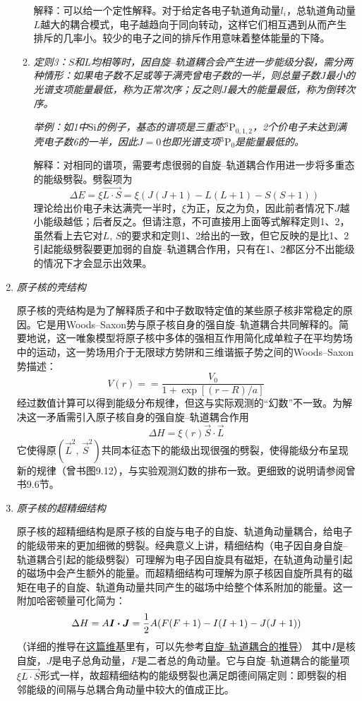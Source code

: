 \begin{enumerate}[label=\textbf{6.\Roman*}, listparindent=\parindent]
\begin{enumerate}
    解释：可以给一个定性解释。对于给定各电子轨道角动量$l_i$，总轨道角动量$L$越大的耦合模式，电子越趋向于同向转动，这样它们相互遇到从而产生排斥的几率小。较少的电子之间的排斥作用意味着整体能量的下降。
    
    \item \emph{定则3：$S$和$L$均相等时，因自旋--轨道耦合会产生进一步能级分裂，需分两种情形：如果电子数不足或等于满壳曾电子数的一半，则总量子数$J$最小的光谱支项能量最低，称为正常次序；反之则$J$最大的能量最低，称为倒转次序。}
    
    \emph{举例：如1中$\mathrm{Si}$的例子，基态的谱项是三重态$\mathrm{^3P_{0,1,2}}$，2个价电子未达到满壳电子数6的一半，因此$J=0$也即光谱支项$\mathrm{^3P_{0}}$是能量最低的。}
    
    解释：对相同的谱项，需要考虑很弱的自旋--轨道耦合作用进一步将多重态的能级劈裂。劈裂项为
    \[\Delta E = \xi \vec{L\cdot S} = \xi(J(J+1)-L(L+1)-S(S+1))\]
    理论给出价电子未达满壳一半时，$\xi$为正，反之为负，因此前者情况下$J$越小能级越低；后者反之。但请注意，不可直接用上面等式解释定则1、2，虽然看上去它对$L$, $S$的要求和定则1、2给出的一致，但它反映的是比1、2引起能级劈裂要更加弱的自旋--轨道耦合作用，只有在1、2都区分不出能级的情况下才会显示出效果。
    
\end{enumerate}

\item \emph{原子核的壳结构}

原子核的壳结构是为了解释质子和中子数取特定值的某些原子核非常稳定的原因。它是用Woods--Saxon势与原子核自身的强自旋--轨道耦合共同解释的。简要地说，这一唯象模型将原子核中多体的强相互作用简化成单粒子在平均势场中的运动，这一势场用介于无限球方势阱和三维谐振子势之间的Woods--Saxon势描述：
\[V(r)==\frac{V_0}{1+\exp[(r-R)/a]}\]
经过数值计算可以得到能级分布规律，但这与实际观测的“幻数”不一致。为解决这一矛盾需引入原子核自身的强自旋--轨道耦合作用
\[\Delta H = \xi(r) \vec{S}\cdot \vec{L}\]
它使得原$(\vec{L}^2,\,\vec{S}^2)$共同本征态下的能级出现很强的劈裂，使得能级分布呈现新的规律（曾书图9.12），与实验观测幻数的排布一致。更细致的说明请参阅曾书9.6节。

\item \emph{原子核的超精细结构}

原子核的超精细结构是原子核的自旋与电子的自旋、轨道角动量耦合，给电子的能级带来的更加细微的劈裂。经典意义上讲，精细结构（电子因自身自旋--轨道耦合引起的能级劈裂）可理解为电子因自旋具有磁矩，在轨道角动量引起的磁场中会产生额外的能量。而超精细结构可理解为原子核因自旋所具有的磁矩在电子的自旋、轨道角动量共同产生的磁场中给整个体系附加的能量。这一附加哈密顿量可化简为：
\[\Delta H =A\boldsymbol{I\cdot J}=\frac{1}{2}A\qty(F(F+1)-I(I+1)-J(J+1))\]
（详细的推导在\href{https://en.wikipedia.org/wiki/Hyperfine_structure}{这篇维基}里有，可以先参考\href{https://en.wikipedia.org/wiki/Spin\%E2\%80\%93orbit_interaction}{自旋--轨道耦合的推导}）
其中$I$是核自旋，$J$是电子总角动量，$F$是二者总的角动量。它与自旋--轨道耦合的能量项$\xi\vec{L\cdot S}$形式一样，故超精细结构的能级劈裂也满足朗德间隔定则：即劈裂的相邻能级的间隔与总耦合角动量中较大的值成正比。


\end{enumerate}
